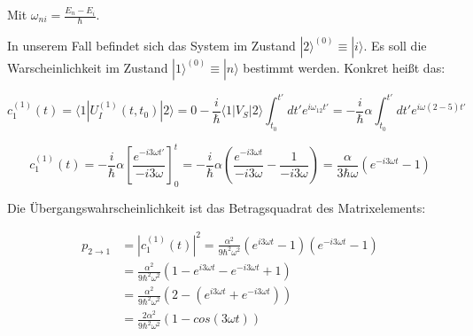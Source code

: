 Mit \(\omega_{ni} =\frac{E_n-E_i}{\hbar} \). 

In unserem Fall befindet sich das System im Zustand \(|2\rangle^{(0)} \equiv |i\rangle  \). Es soll die Warscheinlichkeit im Zustand \(|1\rangle^{(0)} \equiv |n\rangle  \) bestimmt werden. Konkret heißt das:

\[ c_1^{(1)}(t) =  \langle 1| U_I^{(1)}(t,t_0)|2\rangle = 0 - \frac{i}{\hbar}\langle 1|V_S  |2\rangle \int_{t_0}^{t'} dt' e^{i\omega_{12}t'} = - \frac{i}{\hbar}\alpha  \int_{t_0}^{t'} dt' e^{i\omega(2-5)t'}\]

\[ c_1^{(1)}(t) =  - \frac{i}{\hbar}\alpha   \left[\frac{e^{-i3\omega t'}}{-i3\omega}\right]^{t}_{0} = - \frac{i}{\hbar}\alpha (\frac{e^{-i3\omega t}}{-i3\omega}-\frac{1}{-i3\omega}) = \frac{\alpha}{3\hbar\omega} (e^{-i3\omega t}-1) \]

Die Übergangswahrscheinlichkeit ist das Betragsquadrat des Matrixelements:

\begin{align} 
p_{2 \to 1} &= |c_1^{(1)}(t)|^2 = \frac{\alpha^2}{9\hbar^2\omega^2} (e^{i3\omega t}-1)(e^{-i3\omega t}-1) \\
&= \frac{\alpha^2}{9\hbar^2\omega^2} (1-e^{i3\omega t}-e^{-i3\omega t}+1) \\
&= \frac{\alpha^2}{9\hbar^2\omega^2} (2-(e^{i3\omega t}+e^{-i3\omega t})) \\
&= \frac{2\alpha^2}{9\hbar^2\omega^2} (1-cos(3\omega t))
\end{align}

 






